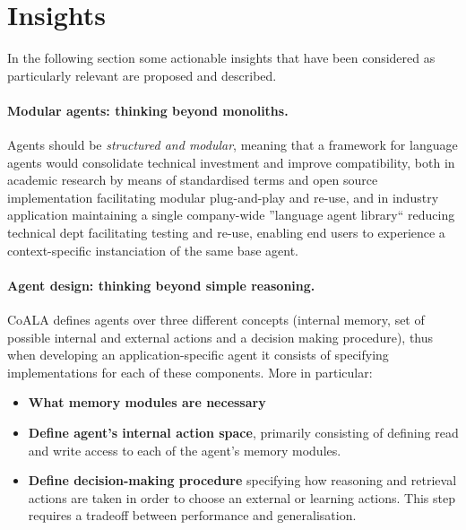 \section{Insights}
In the following section some actionable insights that have been considered as
particularly relevant are proposed and described.

\paragraph{Modular agents: thinking beyond monoliths.} Agents should be
\emph{structured and modular}, meaning that a framework for language agents
would consolidate technical investment and improve compatibility, both in
academic research by means of standardised terms and open source implementation
facilitating modular plug-and-play and re-use, and in industry application
maintaining a single company-wide ''language agent library`` reducing technical
dept facilitating testing and re-use, enabling end users to experience a context-specific
instanciation of the same base agent.

\paragraph{Agent design: thinking beyond simple reasoning.} \ac{CoALA} defines
agents over three different concepts (internal memory, set of possible internal
and external actions and a decision making procedure), thus when developing an
application-specific agent it consists of specifying implementations for each
of these components. More in particular:
\begin{itemize}
    \item \textbf{What memory modules are necessary}
    \item \textbf{Define agent's internal action space}, primarily consisting
        of defining read and write access to each of the agent's memory
        modules.
    \item\textbf{Define decision-making procedure} specifying how reasoning
        and retrieval actions are taken in order to choose an external or learning
        actions. This step requires a tradeoff between performance and
        generalisation.
\end{itemize}

